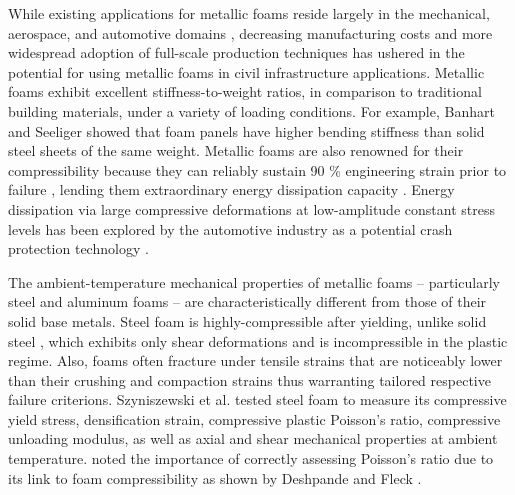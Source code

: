 \documentclass[review]{elsarticle}
\begin{document}
 While existing applications for metallic foams reside largely in the mechanical, aerospace, and automotive domains \cite{Smithetal2012}, decreasing manufacturing costs and more widespread adoption of full-scale production techniques has ushered in the potential for using metallic foams in civil infrastructure applications. Metallic foams exhibit excellent stiffness-to-weight ratios, in comparison to traditional building materials, under a variety of loading conditions. For example, Banhart and Seeliger \cite{BanhartSeeliger2008} showed that foam panels have higher bending stiffness than solid steel sheets of the same weight. Metallic foams are also renowned for their compressibility because they can reliably sustain 90 \% engineering strain prior to failure \cite{GibsonAshsby1999}, lending them extraordinary energy dissipation capacity \cite{Ashsby2000}. Energy dissipation via large compressive deformations at low-amplitude constant stress levels has been explored by the automotive industry as a potential crash protection technology \cite{Lefebvreetal2008}.

The ambient-temperature mechanical properties of metallic foams – particularly steel and aluminum foams – are characteristically different from those of their solid base metals. Steel foam is highly-compressible after yielding, unlike solid steel \cite{DeshpandeFleck2000}, which exhibits only shear deformations and is incompressible in the plastic regime. Also, foams often fracture under tensile strains that are noticeably lower than their crushing and compaction strains \cite{Reyesetal2003} thus warranting tailored respective failure criterions. Szyniszewski et al. \cite{Szyniszewskietal2014} tested steel foam to measure its compressive yield stress, densification strain, compressive plastic Poisson’s ratio, compressive unloading modulus, as well as axial and shear mechanical properties at ambient temperature. \cite{Szyniszewskietal2014} noted the importance of correctly assessing Poisson’s ratio due to its link to foam compressibility as shown by Deshpande and Fleck \cite{DeshpandeFleck2000}.
\end{document}
